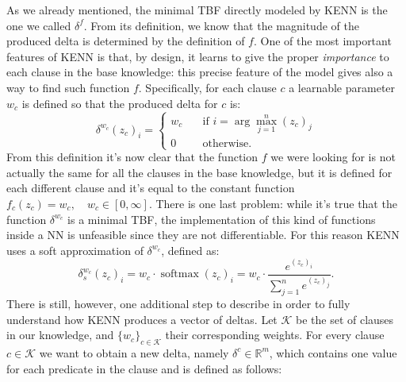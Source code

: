 As we already mentioned, the minimal TBF directly modeled by KENN is the one we called $\delta^f$. From its definition, we know that the magnitude of the produced delta is determined by the definition of $f$. One of the most important features of KENN is that, by design, it learns to give the proper \textit{importance} to each clause in the base knowledge: this precise feature of the model gives also a way to find such function $f$. Specifically, for each clause $c$ a learnable parameter $w_c$ is defined so that the produced delta for $c$ is:
\textcolor{unipd}{\begin{equation*}
	\delta^{w_c}(z_c)_i = 
	\begin{cases}
	w_c \quad &\text{if } i = \arg\max_{j=1}^n(z_c)_j \\
	0 \quad &\text{otherwise.}
	\end{cases}
	\end{equation*}}
From this definition it's now clear that the function $f$ we were looking for is not actually the same for all the clauses in the base knowledge, but it is defined for each different clause and it's equal to the constant \textcolor{unipd}{function $f_c(z_c) = w_c, \quad w_c \in \left[0, \infty\right]$}. 
There is one last problem: while it's true that the function $\delta^{w_c}$ is a minimal TBF, the implementation of this kind of functions inside a NN is unfeasible since they are not differentiable. For this reason KENN uses a soft approximation of $\delta^{w_c}$, defined as:
\textcolor{unipd}{\begin{equation}
	\delta_s^{w_c}(z_c)_i = w_c \cdot \operatorname{softmax}(z_c)_i = w_c \cdot \frac{e^{(z_c)_i}}{\sum_{j=1}^ne^{(z_c)_j}}.
	\label{eq:soft_approx_delta}
	\end{equation}}
\textcolor{unipd}{There is still, however, one additional step to describe in order to fully understand how KENN produces a vector of deltas}. Let $\mathcal{K}$ be the set of clauses in our knowledge, and $\{w_c\}_{c\in\mathcal{K}}$ their corresponding weights. For every clause $c\in \mathcal{K}$ we want to obtain a new delta, namely $\delta^c \in \mathbb{R}^m$, which contains one value for each predicate in the clause and is defined as follows:
